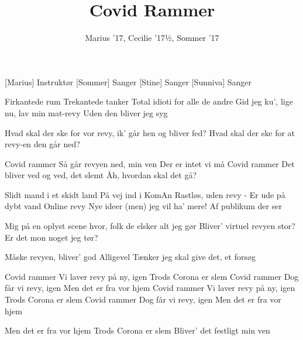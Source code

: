 \documentclass[a4paper,11pt]{article}
\title{Covid Rammer}
\author{Marius '17, Cecilie '17½, Sommer '17}
\begin{document}
\maketitle

\begin{roles}
[Marius] Instruktør
[Sommer] Sanger
[Stine] Sanger
[Sunniva] Sanger
\end{roles}

\begin{song}
 Firkantede rum
Trekantede tanker
Total idioti for alle de andre
Gid jeg ku', lige nu, lav min mat-revy
Uden den bliver jeg syg

 Hvad skal der ske for vor revy, ik' går hen og bliver fed?
Hvad skal der ske for at revy-en den går ned?

 Covid rammer
Så går revyen ned, min ven
Der er intet vi må
Covid rammer
Det bliver ved og ved, det slemt
Åh, hvordan skal det gå?

 Slidt mand i et skidt land
På vej ind i KomAn
Rastløs, uden revy - Er ude på dybt vand
Online revy
Nye ideer
(men) jeg vil ha' mere!
Af publikum der ser

 Mig på en oplyst scene hvor, folk de elsker alt jeg gør
Bliver' virtuel revyen stor? Er det mon noget jeg tør?

Måske revyen, bliver' god
Alligevel
Tænker jeg skal give det, et forsøg

 Covid rammer
Vi laver revy på ny, igen
Trods Corona er slem
Covid rammer
Dog får vi revy, igen
Men det er fra vor hjem
Covid rammer
Vi laver revy på ny, igen
Trods Corona er slem
Covid rammer
Dog får vi revy, igen
Men det er fra vor hjem

 Men det er fra vor hjem
Trods Corona er slem
Bliver' det festligt min ven
\end{song}
\end{document}

